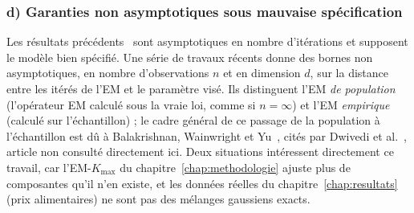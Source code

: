 \subsubsection{d) Garanties non asymptotiques sous mauvaise spécification}\label{sec:d_garanties_non_asymptotiques_sous}
Les résultats précédents~\cite{dempster1977,wu1983} sont asymptotiques en nombre d'itérations et supposent le modèle bien spécifié. Une série de travaux récents donne des bornes non asymptotiques, en nombre d'observations $n$ et en dimension $d$, sur la distance entre les itérés de l'EM et le paramètre visé. Ils distinguent l'EM \emph{de population} (l'opérateur EM calculé sous la vraie loi, comme si $n = \infty$) et l'EM \emph{empirique} (calculé sur l'échantillon) ; le cadre général de ce passage de la population à l'échantillon est dû à Balakrishnan, Wainwright et Yu~\cite{balakrishnan2017}, cités par Dwivedi et al.~\cite{dwivedi2020}, article non consulté directement ici. Deux situations intéressent directement ce travail, car l'EM-$K_{\max}$ du chapitre~\ref{chap:methodologie} ajuste plus de composantes qu'il n'en existe, et les données réelles du chapitre~\ref{chap:resultats} (prix alimentaires) ne sont pas des mélanges gaussiens exacts.

